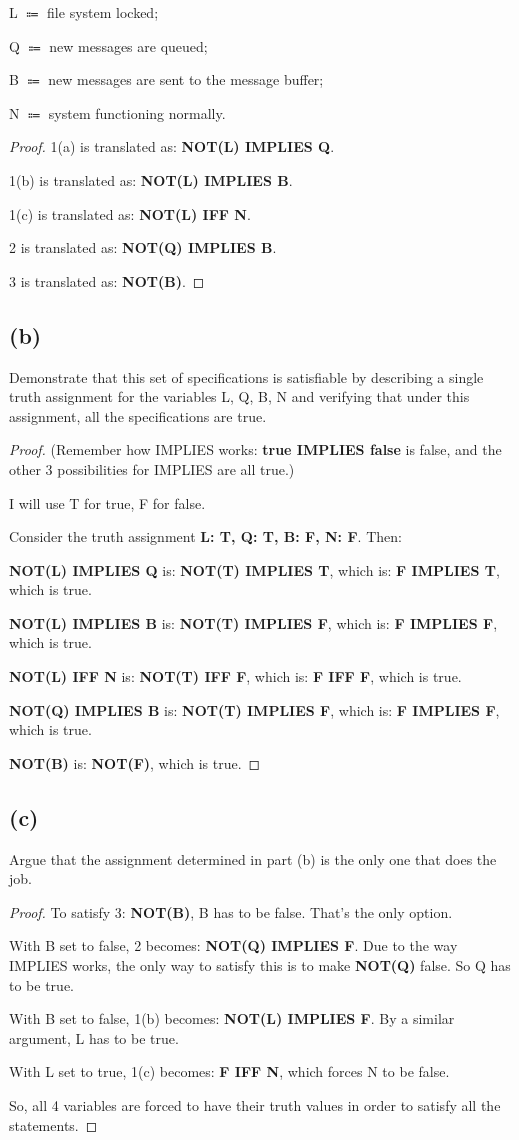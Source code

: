 \documentclass[14pt]{extarticle}
\begin{document}
L $\Coloneqq$ file system locked;

Q $\Coloneqq$ new messages are queued;

B $\Coloneqq$ new messages are sent to the message buffer;

N $\Coloneqq$ system functioning normally.
\begin{proof}
1(a) is translated as: {\bf NOT(L) IMPLIES Q}.

1(b) is translated as: {\bf NOT(L) IMPLIES B}.

1(c) is translated as: {\bf NOT(L) IFF N}.

2 is translated as: {\bf NOT(Q) IMPLIES B}.

3 is translated as: {\bf NOT(B)}.
\end{proof}

\subsection{(b)}
Demonstrate that this set of specifications is satisfiable by describing a single truth assignment for the variables L, Q, B, N and verifying that under this assignment, all the specifications are true.
\begin{proof}
(Remember how IMPLIES works: {\bf true IMPLIES false} is false, and the other 3 possibilities for IMPLIES are all true.)

I will use T for true, F for false.

Consider the truth assignment {\bf L: T, Q: T, B: F, N: F}. Then:

{\bf NOT(L) IMPLIES Q} is: {\bf NOT(T) IMPLIES T}, which is: {\bf F IMPLIES T}, which is true.

{\bf NOT(L) IMPLIES B} is: {\bf NOT(T) IMPLIES F}, which is: {\bf F IMPLIES F}, which is true.

{\bf NOT(L) IFF N} is: {\bf NOT(T) IFF F}, which is: {\bf F IFF F}, which is true.

{\bf NOT(Q) IMPLIES B} is: {\bf NOT(T) IMPLIES F}, which is: {\bf F IMPLIES F}, which is true.

{\bf NOT(B)} is: {\bf NOT(F)}, which is true.
\end{proof}

\subsection{(c)}
Argue that the assignment determined in part (b) is the only one that does the job.
\begin{proof}
To satisfy 3: {\bf NOT(B)}, B has to be false. That's the only option.

With B set to false, 2 becomes: {\bf NOT(Q) IMPLIES F}. Due to the way IMPLIES works, the only way to satisfy this is to make {\bf NOT(Q)} false. So Q has to be true.

With B set to false, 1(b) becomes: {\bf NOT(L) IMPLIES F}. By a similar argument, L has to be true. 

With L set to true, 1(c) becomes: {\bf F IFF N}, which forces N to be false.

So, all 4 variables are forced to have their truth values in order to satisfy all the statements.
\end{proof}
\end{document}
